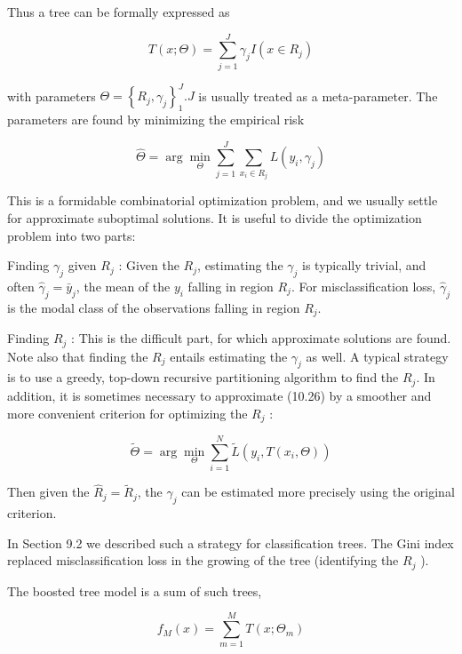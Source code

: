 \documentclass[10pt]{article}
\begin{document}
Thus a tree can be formally expressed as


\begin{equation*}
T(x ; \Theta)=\sum_{j=1}^{J} \gamma_{j} I\left(x \in R_{j}\right) \tag{10.25}
\end{equation*}


with parameters $\Theta=\left\{R_{j}, \gamma_{j}\right\}_{1}^{J} . J$ is usually treated as a meta-parameter. The parameters are found by minimizing the empirical risk


\begin{equation*}
\hat{\Theta}=\arg \min _{\Theta} \sum_{j=1}^{J} \sum_{x_{i} \in R_{j}} L\left(y_{i}, \gamma_{j}\right) \tag{10.26}
\end{equation*}


This is a formidable combinatorial optimization problem, and we usually settle for approximate suboptimal solutions. It is useful to divide the optimization problem into two parts:

Finding $\gamma_{j}$ given $R_{j}$ : Given the $R_{j}$, estimating the $\gamma_{j}$ is typically trivial, and often $\hat{\gamma}_{j}=\bar{y}_{j}$, the mean of the $y_{i}$ falling in region $R_{j}$. For misclassification loss, $\hat{\gamma}_{j}$ is the modal class of the observations falling in region $R_{j}$.

Finding $R_{j}$ : This is the difficult part, for which approximate solutions are found. Note also that finding the $R_{j}$ entails estimating the $\gamma_{j}$ as well. A typical strategy is to use a greedy, top-down recursive partitioning algorithm to find the $R_{j}$. In addition, it is sometimes necessary to approximate (10.26) by a smoother and more convenient criterion for optimizing the $R_{j}$ :


\begin{equation*}
\tilde{\Theta}=\arg \min _{\Theta} \sum_{i=1}^{N} \tilde{L}\left(y_{i}, T\left(x_{i}, \Theta\right)\right) \tag{10.27}
\end{equation*}


Then given the $\hat{R}_{j}=\tilde{R}_{j}$, the $\gamma_{j}$ can be estimated more precisely using the original criterion.

In Section 9.2 we described such a strategy for classification trees. The Gini index replaced misclassification loss in the growing of the tree (identifying the $R_{j}$ ).

The boosted tree model is a sum of such trees,


\begin{equation*}
f_{M}(x)=\sum_{m=1}^{M} T\left(x ; \Theta_{m}\right) \tag{10.28}
\end{equation*}
\end{document}

